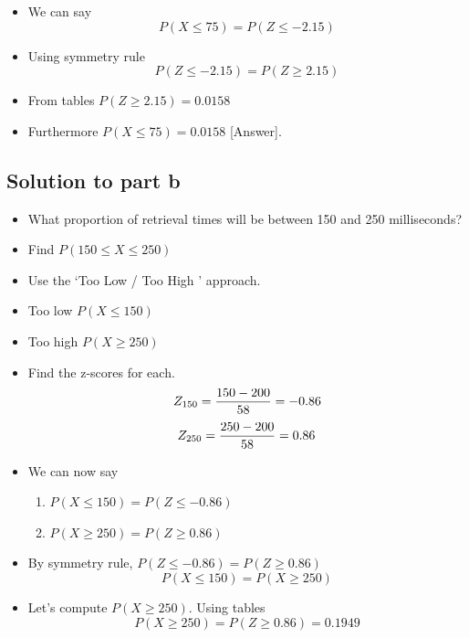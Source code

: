 \documentclass[a4paper,12pt]{article}
\begin{document}
	
	\begin{itemize}
		\item We can say
		\[ P( X \leq 75) = P( Z \leq -2.15)\]
		\item Using symmetry rule
		\[ P( Z \leq -2.15) = P( Z \geq 2.15)\]
		\item From tables $P( Z \geq 2.15) = 0.0158$
		\item Furthermore $P( X \leq 75) = \boldsymbol{0.0158}$ [Answer].
	\end{itemize}
				

\newpage	

	
	\subsection*{Solution to part b}
	\begin{itemize}
		\item What proportion of retrieval times will be between 150 and 250 milliseconds?
		\item Find $P(150 \leq X \leq 250)$
		\item Use the `Too Low / Too High ' approach.
		\item Too low $P( X \leq 150)$
		\item Too high $P( X \geq 250)$
		\item Find the z-scores for each.
		\[ Z_{150} =  {150 - 200 \over 58}  = -0.86 \]
		\[ Z_{250} =  {250 - 200 \over 58}  = 0.86 \]
	\end{itemize}

	
	\begin{itemize}
		\item We can now say
		\begin{enumerate}
		    \item $P( X \leq 150) = P( Z \leq -0.86)$
		\item $P( X \geq 250) = P( Z \geq 0.86)$
		\end{enumerate}

		\item By symmetry rule, $P( Z \leq -0.86) = P( Z \geq 0.86)$
		\[ P( X \leq 150) =  P( X \geq 250) \]
		\item Let's compute $P( X \geq 250)$. Using tables
		\[P( X \geq 250) = P( Z \geq 0.86) = 0.1949 \]
	\end{itemize}
\end{document}
